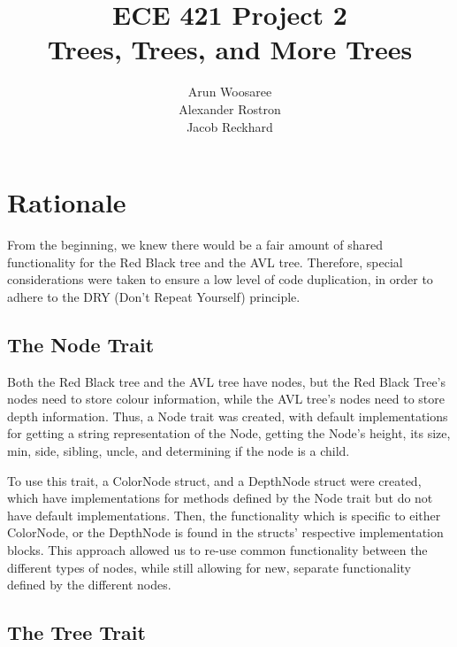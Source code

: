 \documentclass[letterpaper]{article}
\title{ECE 421 Project 2\\
Trees, Trees, and More Trees}
\author{Arun Woosaree\\
Alexander Rostron\\
Jacob Reckhard
}
\begin{document}
\maketitle %

\section{Rationale}
From the beginning, we knew there would be a fair amount of shared functionality
for the Red Black tree and the AVL tree. Therefore, special considerations were
taken to ensure a low level of code duplication, in order to adhere to the DRY
(Don't Repeat Yourself) principle.

\subsection{The Node Trait}\label{dry}
Both the Red Black tree and the AVL tree have nodes, but the Red Black Tree's
nodes need to store colour information, while the AVL tree's nodes need to store
depth information. Thus, a Node trait was created, with default implementations
for getting a string representation of the Node, getting the Node's height, its
size, min, side, sibling, uncle, and determining if the node is a child.

To use this trait, a ColorNode struct, and a DepthNode struct were created,
which have implementations for methods defined by the Node trait but do not have
default implementations. Then, the functionality which is specific to either
ColorNode, or the DepthNode is found in the structs' respective implementation
blocks. This approach allowed us to re-use common functionality between the
different types of nodes, while still allowing for new, separate functionality
defined by the different nodes.

\subsection{The Tree Trait}
\end{document}
